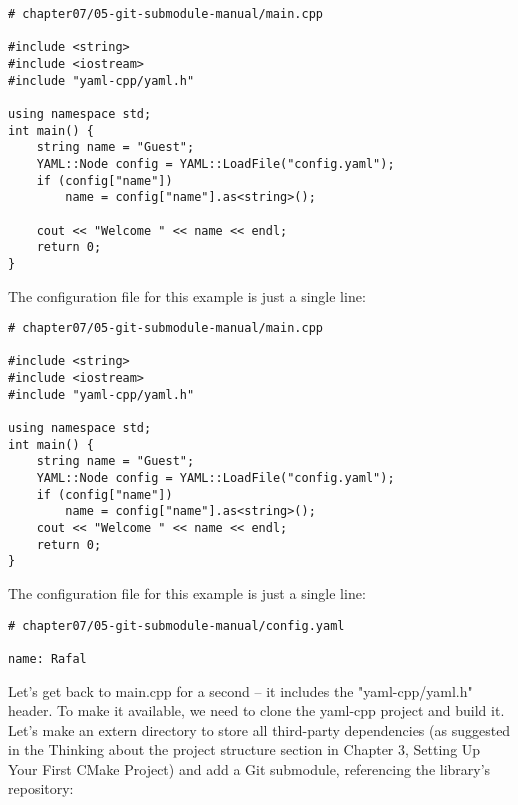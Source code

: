 \begin{lstlisting}[style=styleCMake]
# chapter07/05-git-submodule-manual/main.cpp

#include <string>
#include <iostream>
#include "yaml-cpp/yaml.h"

using namespace std;
int main() {
	string name = "Guest";
	YAML::Node config = YAML::LoadFile("config.yaml");
	if (config["name"])
		name = config["name"].as<string>();
	
	cout << "Welcome " << name << endl;
	return 0;
}
\end{lstlisting}

The configuration file for this example is just a single line:

\begin{lstlisting}[style=styleCMake]
# chapter07/05-git-submodule-manual/main.cpp

#include <string>
#include <iostream>
#include "yaml-cpp/yaml.h"

using namespace std;
int main() {
	string name = "Guest";
	YAML::Node config = YAML::LoadFile("config.yaml");
	if (config["name"])
		name = config["name"].as<string>();
	cout << "Welcome " << name << endl;
	return 0;
}
\end{lstlisting}

The configuration file for this example is just a single line:

\begin{lstlisting}[style=styleCMake]
# chapter07/05-git-submodule-manual/config.yaml

name: Rafal
\end{lstlisting}

Let's get back to main.cpp for a second – it includes the "yaml-cpp/yaml.h" header. To make it available, we need to clone the yaml-cpp project and build it. Let's make an extern directory to store all third-party dependencies (as suggested in the Thinking about the project structure section in Chapter 3, Setting Up Your First CMake Project) and add a Git submodule, referencing the library's repository:


